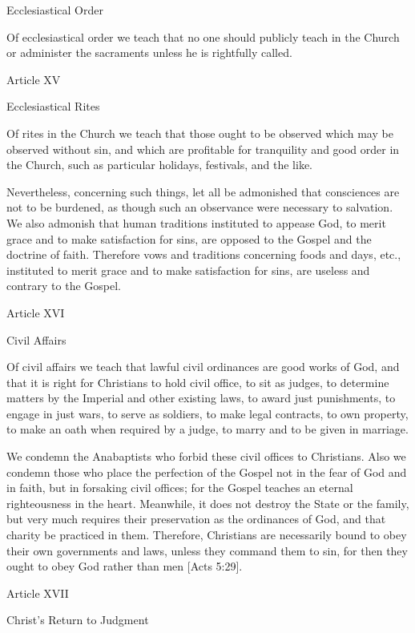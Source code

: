 Ecclesiastical Order

Of ecclesiastical order we teach that no one should publicly teach in the Church or administer the sacraments unless he is rightfully called.

 

Article XV

Ecclesiastical Rites

Of rites in the Church we teach that those ought to be observed which may be observed without sin, and which are profitable for tranquility and good order in the Church, such as particular holidays, festivals, and the like.

Nevertheless, concerning such things, let all be admonished that consciences are not to be burdened, as though such an observance were necessary to salvation. We also admonish that human traditions instituted to appease God, to merit grace and to make satisfaction for sins, are opposed to the Gospel and the doctrine of faith. Therefore vows and traditions concerning foods and days, etc., instituted to merit grace and to make satisfaction for sins, are useless and contrary to the Gospel.

 

 

Article XVI

Civil Affairs

Of civil affairs we teach that lawful civil ordinances are good works of God, and that it is right for Christians to hold civil office, to sit as judges, to determine matters by the Imperial and other existing laws, to award just punishments, to engage in just wars, to serve as soldiers, to make legal contracts, to own property, to make an oath when required by a judge, to marry and to be given in marriage.

We condemn the Anabaptists who forbid these civil offices to Christians. Also we condemn those who place the perfection of the Gospel not in the fear of God and in faith, but in forsaking civil offices; for the Gospel teaches an eternal righteousness in the heart. Meanwhile, it does not destroy the State or the family, but very much requires their preservation as the ordinances of God, and that charity be practiced in them. Therefore, Christians are necessarily bound to obey their own governments and laws, unless they command them to sin, for then they ought to obey God rather than men [Acts 5:29].

 

Article XVII

Christ’s Return to Judgment


